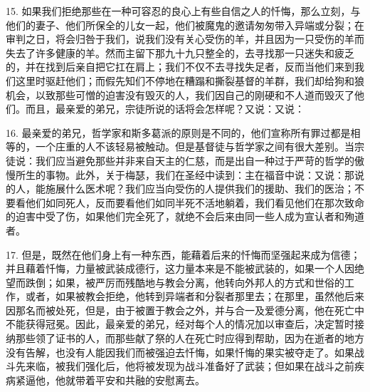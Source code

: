 15. 如果我们拒绝那些在一种可容忍的良心上有些自信之人的忏悔，那么立刻，与他们的妻子、他们所保全的儿女一起，他们被魔鬼的邀请匆匆带入异端或分裂；在审判之日，将会归咎于我们，说我们没有关心受伤的羊，并且因为一只受伤的羊而失去了许多健康的羊。然而主留下那九十九只整全的，去寻找那一只迷失和疲乏的，并在找到后亲自把它扛在肩上；我们不仅不去寻找失足者，反而当他们来到我们这里时驱赶他们；而假先知们不停地在糟蹋和撕裂基督的羊群，我们却给狗和狼机会，以致那些可憎的迫害没有毁灭的人，我们因自己的刚硬和不人道而毁灭了他们。而且，最亲爱的弟兄，宗徒所说的话将会怎样呢？又说：又说：\par

16. 最亲爱的弟兄，哲学家和斯多葛派的原则是不同的，他们宣称所有罪过都是相等的，一个庄重的人不该轻易被触动。但是基督徒与哲学家之间有很大差别。当宗徒说：我们应当避免那些并非来自天主的仁慈，而是出自一种过于严苛的哲学的傲慢所生的事物。此外，关于梅瑟，我们在圣经中读到：主在福音中说：又说：那说的人，能施展什么医术呢？我们应当向受伤的人提供我们的援助、我们的医治；不要看他们如同死人，反而要看他们如同半死不活地躺着，我们看见他们在那次致命的迫害中受了伤，如果他们完全死了，就绝不会后来由同一些人成为宣认者和殉道者。\par

17. 但是，既然在他们身上有一种东西，能藉着后来的忏悔而坚强起来成为信德；并且藉着忏悔，力量被武装成德行，这力量本来是不能被武装的，如果一个人因绝望而跌倒；如果，被严厉而残酷地与教会分离，他转向外邦人的方式和世俗的工作，或者，如果被教会拒绝，他转到异端者和分裂者那里去；在那里，虽然他后来因那名而被处死，但是，由于被置于教会之外，并与合一及爱德分离，他在死亡中不能获得冠冕。因此，最亲爱的弟兄，经对每个人的情况加以审查后，决定暂时接纳那些领了证书的人，而那些献了祭的人在死亡时应得到帮助，因为在逝者的地方没有告解，也没有人能因我们而被强迫去忏悔，如果忏悔的果实被夺走了。如果战斗先来临，被我们强化后，他将被发现为战斗准备好了武装；但如果在战斗之前疾病紧逼他，他就带着平安和共融的安慰离去。\par

